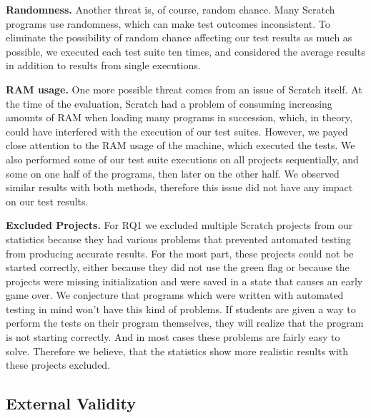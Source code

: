 \textbf{Randomness.}
Another threat is, of course, random chance.
Many Scratch programs use randomness, which can make test outcomes inconsistent.
To eliminate the possibility of random chance affecting our test results as much as possible, we executed each test suite ten times,
and considered the average results in addition to results from single executions.
\parspace

\textbf{RAM usage.}
One more possible threat comes from an issue of Scratch itself.
At the time of the evaluation, Scratch had a problem of consuming increasing amounts of RAM when loading many programs in succession,
which, in theory, could have interfered with the execution of our test suites.
However, we payed close attention to the RAM usage of the machine, which executed the tests.
We also performed some of our test suite executions on all projects sequentially,
and some on one half of the programs, then later on the other half.
We observed similar results with both methods, therefore this issue did not have any impact on our test results.
\parspace

\textbf{Excluded Projects.}
For RQ1 we excluded multiple Scratch projects from our statistics because they had various problems that
prevented automated testing from producing accurate results.
For the most part, these projects could not be started correctly,
either because they did not use the green flag or because the projects were missing initialization and were
saved in a state that causes an early game over.
We conjecture that programs which were written with automated testing in mind won't have this kind of problems.
If students are given a way to perform the tests on their program themselves, they will realize that the program is not starting correctly.
And in most cases these problems are fairly easy to solve.
Therefore we believe, that the statistics show more realistic results with these projects excluded.

\subsection{External Validity}


